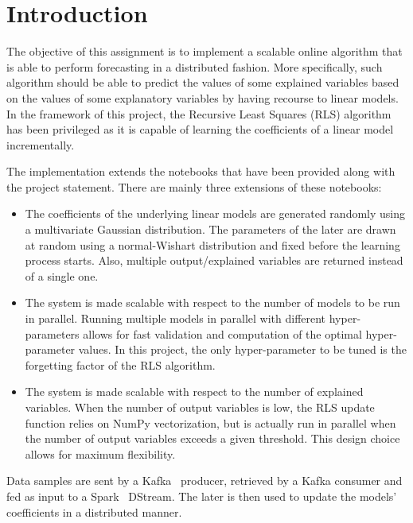 \chapter{Introduction}

The objective of this assignment is to implement a scalable online algorithm
that is able to perform forecasting in a distributed fashion.
More specifically, such algorithm should be able to predict the values of
some explained variables based on the values of some explanatory variables
by having recourse to linear models. In the framework of this project,
the Recursive Least Squares (RLS) algorithm has been privileged as it is
capable of learning the coefficients of a linear model incrementally.

The implementation extends the notebooks that have been provided
along with the project statement. There are mainly three extensions of these
notebooks:
\begin{itemize}
    \item The coefficients of the underlying linear models are generated randomly
        using a multivariate Gaussian distribution. The parameters of the later
        are drawn at random using a normal-Wishart distribution and fixed
        before the learning process starts.
        Also, multiple output/explained variables are returned instead of a single
        one.
    \item The system is made scalable with respect to the number of models to be
        run in parallel. Running multiple models in parallel with different
        hyper-parameters allows for fast validation and computation of the
        optimal hyper-parameter values. In this project, the only hyper-parameter
        to be tuned is the forgetting factor of the RLS algorithm.
    \item The system is made scalable with respect to the number of explained
        variables. When the number of output variables is low, the RLS update
        function relies on NumPy vectorization, but is actually run in parallel
        when the number of output variables exceeds a given threshold.
        This design choice allows for maximum flexibility.
\end{itemize}

Data samples are sent by a Kafka~\cite{kreps2011kafka} producer, retrieved by a Kafka
consumer and fed as input to a Spark~\cite{zaharia2010spark} DStream.
The later is then used to update the models' coefficients
in a distributed manner. 
